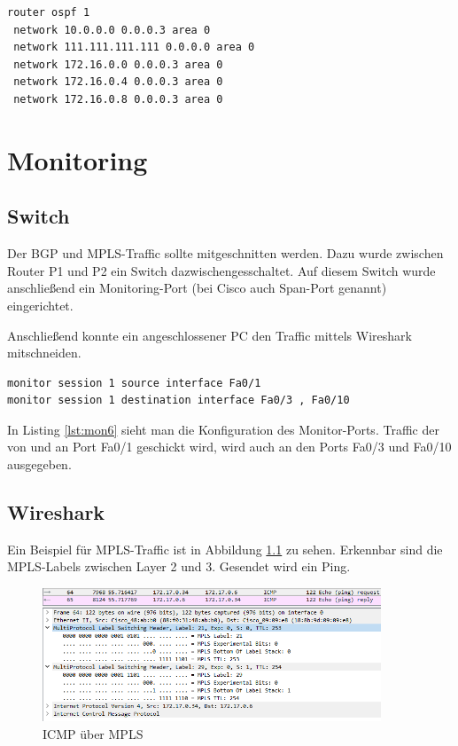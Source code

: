 \begin{lstlisting}[caption={OSPF Process auf P-Router},label={lst:mon7},language={}]
router ospf 1
 network 10.0.0.0 0.0.0.3 area 0
 network 111.111.111.111 0.0.0.0 area 0
 network 172.16.0.0 0.0.0.3 area 0
 network 172.16.0.4 0.0.0.3 area 0
 network 172.16.0.8 0.0.0.3 area 0
\end{lstlisting}

\chapter{Monitoring}

\section{Switch}

Der \ac{BGP} und \ac{MPLS}-Traffic sollte mitgeschnitten werden.
Dazu wurde zwischen Router P1 und P2 ein Switch dazwischengesschaltet. Auf diesem Switch wurde anschließend ein Monitoring-Port (bei Cisco auch Span-Port genannt) eingerichtet.

Anschließend konnte ein angeschlossener PC den Traffic mittels Wireshark mitschneiden.

\begin{lstlisting}[caption={Monitoring-Ports},label={lst:mon7},language={}]
monitor session 1 source interface Fa0/1
monitor session 1 destination interface Fa0/3 , Fa0/10
\end{lstlisting}

In Listing \ref{lst:mon6} sieht man die Konfiguration des Monitor-Ports. Traffic der von und an Port Fa0/1 geschickt wird, wird auch an den Ports Fa0/3 und Fa0/10 ausgegeben.

\section{Wireshark}

Ein Beispiel für \ac{MPLS}-Traffic ist in Abbildung \ref{img:icmp} zu sehen. Erkennbar sind die MPLS-Labels zwischen Layer 2 und 3. Gesendet wird ein Ping.

\begin{figure}[H]
	\centering
	\includegraphics[width=0.9\textwidth]{img/icmp_wireshark.png}
	\caption{ICMP über MPLS}
	\label{img:icmp}
\end{figure}

